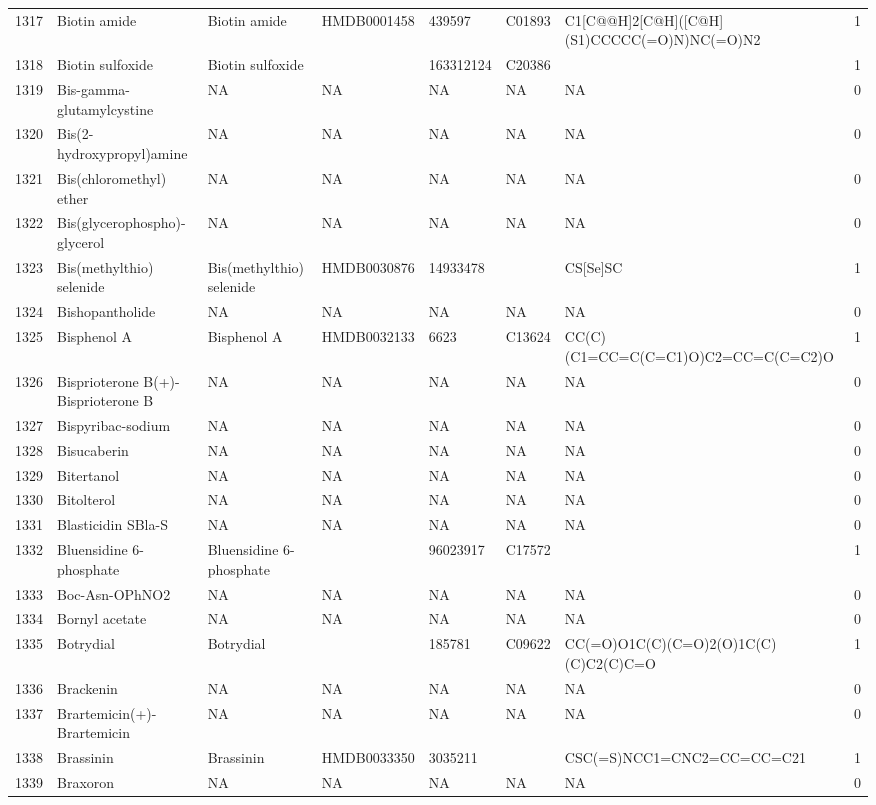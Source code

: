 \documentclass[a4paper]{article}
\begin{document}
\begin{longtable}{rlllllll}
  1317 & Biotin amide & Biotin amide & HMDB0001458 & 439597 & C01893 & C1[C@@H]2[C@H]([C@H](S1)CCCCC(=O)N)NC(=O)N2 & 1 \\ 
  1318 & Biotin sulfoxide & Biotin sulfoxide &  & 163312124 & C20386 &  & 1 \\ 
  1319 & Bis-gamma-glutamylcystine & NA & NA & NA & NA & NA & 0 \\ 
  1320 & Bis(2-hydroxypropyl)amine & NA & NA & NA & NA & NA & 0 \\ 
  1321 & Bis(chloromethyl) ether & NA & NA & NA & NA & NA & 0 \\ 
  1322 & Bis(glycerophospho)-glycerol & NA & NA & NA & NA & NA & 0 \\ 
  1323 & Bis(methylthio) selenide & Bis(methylthio) selenide & HMDB0030876 & 14933478 &  & CS[Se]SC & 1 \\ 
  1324 & Bishopantholide & NA & NA & NA & NA & NA & 0 \\ 
  1325 & Bisphenol A & Bisphenol A & HMDB0032133 & 6623 & C13624 & CC(C)(C1=CC=C(C=C1)O)C2=CC=C(C=C2)O & 1 \\ 
  1326 & Bisprioterone B(+)-Bisprioterone B & NA & NA & NA & NA & NA & 0 \\ 
  1327 & Bispyribac-sodium & NA & NA & NA & NA & NA & 0 \\ 
  1328 & Bisucaberin & NA & NA & NA & NA & NA & 0 \\ 
  1329 & Bitertanol & NA & NA & NA & NA & NA & 0 \\ 
  1330 & Bitolterol & NA & NA & NA & NA & NA & 0 \\ 
  1331 & Blasticidin SBla-S & NA & NA & NA & NA & NA & 0 \\ 
  1332 & Bluensidine 6-phosphate & Bluensidine 6-phosphate &  & 96023917 & C17572 &  & 1 \\ 
  1333 & Boc-Asn-OPhNO2 & NA & NA & NA & NA & NA & 0 \\ 
  1334 & Bornyl acetate & NA & NA & NA & NA & NA & 0 \\ 
  1335 & Botrydial & Botrydial &  & 185781 & C09622 & CC(=O)O1C(C)(C=O)2(O)1C(C)(C)C2(C)C=O & 1 \\ 
  1336 & Brackenin & NA & NA & NA & NA & NA & 0 \\ 
  1337 & Brartemicin(+)-Brartemicin & NA & NA & NA & NA & NA & 0 \\ 
  1338 & Brassinin & Brassinin & HMDB0033350 & 3035211 &  & CSC(=S)NCC1=CNC2=CC=CC=C21 & 1 \\ 
  1339 & Braxoron & NA & NA & NA & NA & NA & 0 \\ 

\end{longtable}
\end{document}
